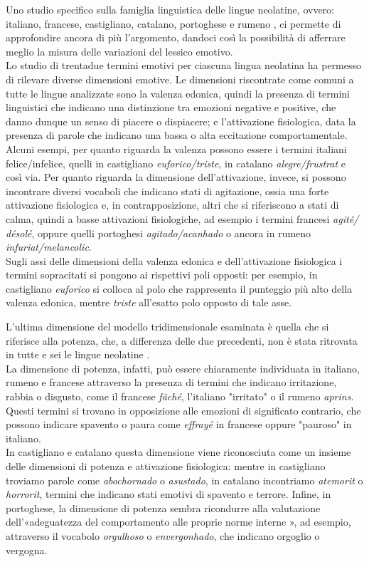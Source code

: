 Uno studio specifico sulla famiglia linguistica delle lingue neolatine, ovvero: italiano, francese, castigliano, catalano, portoghese e rumeno \parencite{Sini}, ci permette di approfondire ancora di più l'argomento, dandoci così la possibilità di afferrare meglio la misura delle variazioni del lessico emotivo. \\
Lo studio di trentadue termini emotivi per ciascuna lingua neolatina ha permesso di rilevare diverse dimensioni emotive. Le dimensioni riscontrate come comuni a tutte le lingue analizzate sono la valenza edonica, quindi la presenza di termini linguistici che indicano una distinzione tra emozioni negative e positive, che danno dunque un senso di piacere o dispiacere; e l'attivazione fisiologica, data la presenza di parole che indicano una bassa o alta eccitazione comportamentale. \\
Alcuni esempi, per quanto riguarda la valenza possono essere i termini italiani felice/infelice, quelli in castigliano \textit{euforico/triste}, in catalano \textit{alegre/frustrat} e così via. Per quanto riguarda la dimensione dell'attivazione, invece, si possono incontrare diversi vocaboli che indicano stati di agitazione, ossia una forte attivazione fisiologica e, in contrapposizione, altri che si riferiscono a stati di calma, quindi a basse attivazioni fisiologiche, ad esempio i termini francesi \textit{agité/ désolé}, oppure quelli portoghesi \textit{agitado/acanhado} o ancora in rumeno \textit{infuriat/melancolic}. \\
Sugli assi delle dimensioni della valenza edonica e dell'attivazione fisiologica i termini sopracitati si pongono ai rispettivi poli opposti: per esempio, in castigliano \textit{euforico} si colloca al polo che rappresenta il punteggio più alto della valenza edonica, mentre \textit{triste} all'esatto polo opposto di tale asse.

L'ultima dimensione del modello tridimensionale esaminata è quella che si riferisce alla potenza, che, a differenza delle due precedenti, non è stata ritrovata in tutte e sei le lingue neolatine \parencite{Sini}.\\
La dimensione di potenza, infatti, può essere chiaramente individuata in italiano, rumeno e francese attraverso la presenza di termini che indicano irritazione, rabbia o disgusto, come il francese \textit{fâché}, l'italiano "irritato" o il rumeno \textit{aprins}. Questi termini si trovano in opposizione alle emozioni di significato contrario, che possono indicare spavento o paura come \textit{effrayé} in francese oppure "pauroso" in italiano.\\
In castigliano e catalano questa dimensione viene riconosciuta come un insieme delle dimensioni di potenza e attivazione fisiologica: mentre in castigliano troviamo parole come \textit{abochornado} o \textit{asustado}, in catalano incontriamo \textit{atemorit} o \textit{horrorit}, termini che indicano stati emotivi di spavento e terrore. Infine, in portoghese, la dimensione di potenza sembra ricondurre alla valutazione dell'«adeguatezza del comportamento alle proprie norme interne \parencite{Sini}», ad esempio, attraverso il vocabolo \textit{orgulhoso} o \textit{envergonhado}, che indicano orgoglio o vergogna. 

